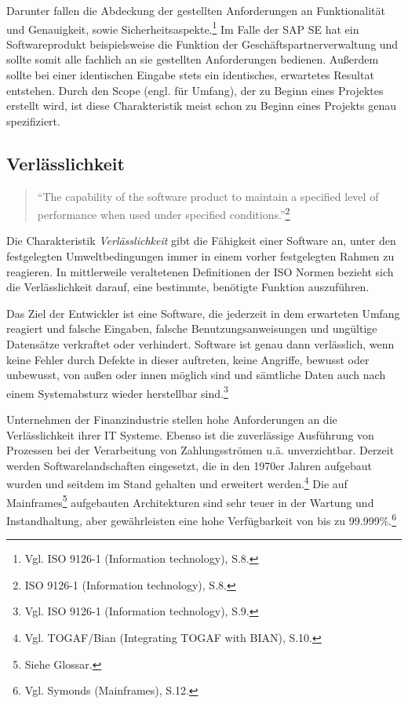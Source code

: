             Darunter fallen die Abdeckung der gestellten Anforderungen an Funktionalität und Genauigkeit, sowie Sicherheitsaspekte.\footnote{Vgl. ISO 9126-1 (Information technology), S.8.} Im Falle der SAP SE hat ein Softwareprodukt beispielsweise die Funktion der Geschäftspartnerverwaltung und sollte somit alle fachlich an sie gestellten Anforderungen bedienen. Außerdem sollte bei einer identischen Eingabe stets ein identisches, erwartetes Resultat entstehen. Durch den Scope (engl. für Umfang), der zu Beginn eines Projektes erstellt wird, ist diese Charakteristik meist schon zu Beginn eines Projekts genau spezifiziert.

        \subsection{Verlässlichkeit}

            \begin{quote}
              \enquote{The capability of the software product to maintain a specified level of performance when used under specified conditions.}\footnote{ISO 9126-1 (Information technology), S.8.}
            \end{quote}

            Die Charakteristik \emph{Verlässlichkeit} gibt die Fähigkeit einer Software an, unter den festgelegten Umweltbedingungen immer in einem vorher festgelegten Rahmen zu reagieren. In mittlerweile veraltetenen Definitionen der ISO Normen bezieht sich die Verlässlichkeit darauf, eine bestimmte, benötigte Funktion auszuführen.

            Das Ziel der Entwickler ist eine Software, die jederzeit in dem erwarteten Umfang reagiert und falsche Eingaben, falsche Benutzungsanweisungen und ungültige Datensätze verkraftet oder verhindert. Software ist genau dann verlässlich, wenn keine Fehler durch Defekte in dieser auftreten, keine Angriffe, bewusst oder unbewusst, von außen oder innen möglich sind und sämtliche Daten auch nach einem Systemabsturz wieder herstellbar sind.\footnote{Vgl. ISO 9126-1 (Information technology), S.9.}

            Unternehmen der Finanzindustrie stellen hohe Anforderungen an die Verlässlichkeit ihrer IT Systeme. Ebenso ist die zuverlässige Ausführung von Prozessen bei der Verarbeitung von Zahlungsströmen u.ä. unverzichtbar.
            Derzeit werden Softwarelandschaften eingesetzt, die in den 1970er Jahren aufgebaut wurden und seitdem im Stand gehalten und erweitert werden.\footnote{Vgl. TOGAF/Bian (Integrating TOGAF with BIAN), S.10.} Die auf Mainframes\footnote{Siehe Glossar.} aufgebauten Architekturen sind sehr teuer in der Wartung und Instandhaltung, aber gewährleisten eine hohe Verfügbarkeit von bis zu 99.999\%.\footnote{Vgl. Symonds (Mainframes), S.12.}

